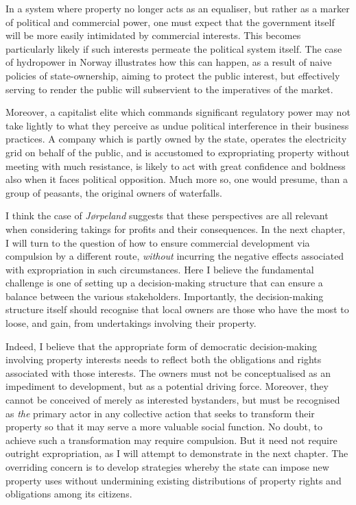 {In a system where property no longer acts as an equaliser, but rather as a marker of political and commercial power, one must expect that the government itself will be more easily intimidated by commercial interests. This becomes particularly likely if such interests permeate the political system itself. The case of hydropower in Norway illustrates how this can happen, as a result of naive policies of state-ownership, aiming to protect the public interest, but effectively serving to render the public will subservient to the imperatives of the market. 

Moreover, a capitalist elite which commands significant regulatory power may not take lightly to what they perceive as undue political interference in their business practices. A company which is partly owned by the state, operates the electricity grid on behalf of the public, and is accustomed to expropriating property without meeting with much resistance, is likely to act with great confidence and boldness also when it faces political opposition. Much more so, one would presume, than a group of peasants, the original owners of waterfalls.

I think the case of \emph{Jørpeland} suggests that these perspectives are all relevant when considering takings for profits and their consequences. In the next chapter, I will turn to the question of how to ensure commercial development via compulsion by a different route, {\it without} incurring the negative effects associated with expropriation in such circumstances. Here I believe the fundamental challenge is one of setting up a decision-making structure that can ensure a balance between the various stakeholders. Importantly, the decision-making structure itself should recognise that local owners are those who have the most to loose, and gain, from undertakings involving their property. 

Indeed, I believe that the appropriate form of democratic decision-making involving property interests needs to reflect both the obligations and rights associated with those interests. The owners must not be conceptualised as an impediment to development, but as a potential driving force. Moreover, they cannot be conceived of merely as interested bystanders, but must be recognised as {\it the} primary actor in any collective action that seeks to transform their property so that it may serve a more valuable social function. No doubt, to achieve such a transformation may require compulsion. But it need not require outright expropriation, as I will attempt to demonstrate in the next chapter. The overriding concern is to develop strategies whereby the state can impose new property uses without undermining existing distributions of property rights and obligations among its citizens.
}

